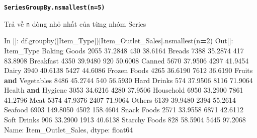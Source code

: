 \documentclass[
]{book}
\newenvironment{Shaded}{\begin{snugshade}}{\end{snugshade}}
\newcommand{\DecValTok}[1]{\textcolor[rgb]{0.00,0.00,0.81}{#1}}
\newcommand{\FloatTok}[1]{\textcolor[rgb]{0.00,0.00,0.81}{#1}}
\newcommand{\KeywordTok}[1]{\textcolor[rgb]{0.13,0.29,0.53}{\textbf{#1}}}
\newcommand{\NormalTok}[1]{#1}
\newcommand{\OperatorTok}[1]{\textcolor[rgb]{0.81,0.36,0.00}{\textbf{#1}}}
\newcommand{\StringTok}[1]{\textcolor[rgb]{0.31,0.60,0.02}{#1}}
\begin{document}
\textbf{\texttt{SeriesGroupBy.nsmallest(n=5)}}

Trả về \texttt{n} dòng nhỏ nhất của từng nhóm Series

\begin{Shaded}
\begin{Highlighting}[]
\NormalTok{In []: df.groupby([}\StringTok{\textquotesingle{}Item\_Type\textquotesingle{}}\NormalTok{])[}\StringTok{\textquotesingle{}Item\_Outlet\_Sales\textquotesingle{}}\NormalTok{].nsmallest(n}\OperatorTok{=}\DecValTok{2}\NormalTok{)}
\NormalTok{Out[]: }
\NormalTok{Item\_Type                  }
\NormalTok{Baking Goods           }\DecValTok{2055}     \FloatTok{37.2848}
                       \DecValTok{430}      \FloatTok{38.6164}
\NormalTok{Breads                 }\DecValTok{7388}     \FloatTok{35.2874}
                       \DecValTok{417}      \FloatTok{83.8908}
\NormalTok{Breakfast              }\DecValTok{4350}     \FloatTok{39.9480}
                       \DecValTok{920}      \FloatTok{50.6008}
\NormalTok{Canned                 }\DecValTok{5670}     \FloatTok{37.9506}
                       \DecValTok{4297}     \FloatTok{41.9454}
\NormalTok{Dairy                  }\DecValTok{3940}     \FloatTok{40.6138}
                       \DecValTok{5427}     \FloatTok{44.6086}
\NormalTok{Frozen Foods           }\DecValTok{4265}     \FloatTok{36.6190}
                       \DecValTok{7612}     \FloatTok{36.6190}
\NormalTok{Fruits }\KeywordTok{and}\NormalTok{ Vegetables  }\DecValTok{8486}     \FloatTok{45.2744}
                       \DecValTok{540}      \FloatTok{56.5930}
\NormalTok{Hard Drinks            }\DecValTok{574}      \FloatTok{37.9506}
                       \DecValTok{8116}     \FloatTok{71.9064}
\NormalTok{Health }\KeywordTok{and}\NormalTok{ Hygiene     }\DecValTok{3053}     \FloatTok{34.6216}
                       \DecValTok{4280}     \FloatTok{37.9506}
\NormalTok{Household              }\DecValTok{6950}     \FloatTok{33.2900}
                       \DecValTok{7861}     \FloatTok{41.2796}
\NormalTok{Meat                   }\DecValTok{5374}     \FloatTok{47.9376}
                       \DecValTok{2407}     \FloatTok{71.9064}
\NormalTok{Others                 }\DecValTok{6139}     \FloatTok{39.9480}
                       \DecValTok{2394}     \FloatTok{55.2614}
\NormalTok{Seafood                }\DecValTok{6903}    \FloatTok{149.8050}
                       \DecValTok{4502}    \FloatTok{158.4604}
\NormalTok{Snack Foods            }\DecValTok{2571}     \FloatTok{33.9558}
                       \DecValTok{6871}     \FloatTok{42.6112}
\NormalTok{Soft Drinks            }\DecValTok{906}      \FloatTok{33.2900}
                       \DecValTok{1913}     \FloatTok{40.6138}
\NormalTok{Starchy Foods          }\DecValTok{828}      \FloatTok{58.5904}
                       \DecValTok{5445}     \FloatTok{97.2068}
\NormalTok{Name: Item\_Outlet\_Sales, dtype: float64}
\end{Highlighting}
\end{Shaded}
\end{document}
